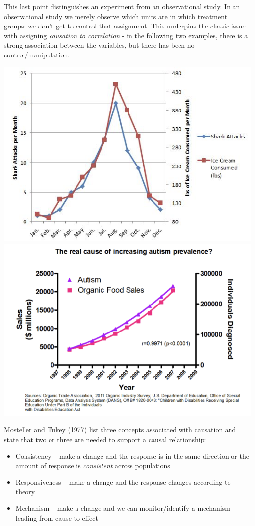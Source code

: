 \documentclass[
]{book}
\providecommand{\tightlist}{%
  \setlength{\itemsep}{0pt}\setlength{\parskip}{0pt}}
\begin{document}
This last point distinguishes an experiment from an observational study. In an observational study we merely observe which units are in which treatment groups; we don't get to control that assignment. This underpins the classic issue with assigning \emph{causation to correlation} - in the following two examples, there is a strong association between the variables, but there has been no control/manipulation.

\includegraphics[width=7.44in]{images/IceCream_Shark}
\includegraphics[width=8.89in]{images/Autism_Organic}

Mosteller and Tukey (1977) list three concepts associated with causation and state that two or three are needed to support a causal relationship:

\begin{itemize}
\tightlist
\item
  Consistency -- make a change and the response is in the same direction or the amount of response is \emph{consistent} across populations
\item
  Responsiveness -- make a change and the response changes according to theory
\item
  Mechanism -- make a change and we can monitor/identify a mechanism leading from cause to effect
\end{itemize}
\end{document}

